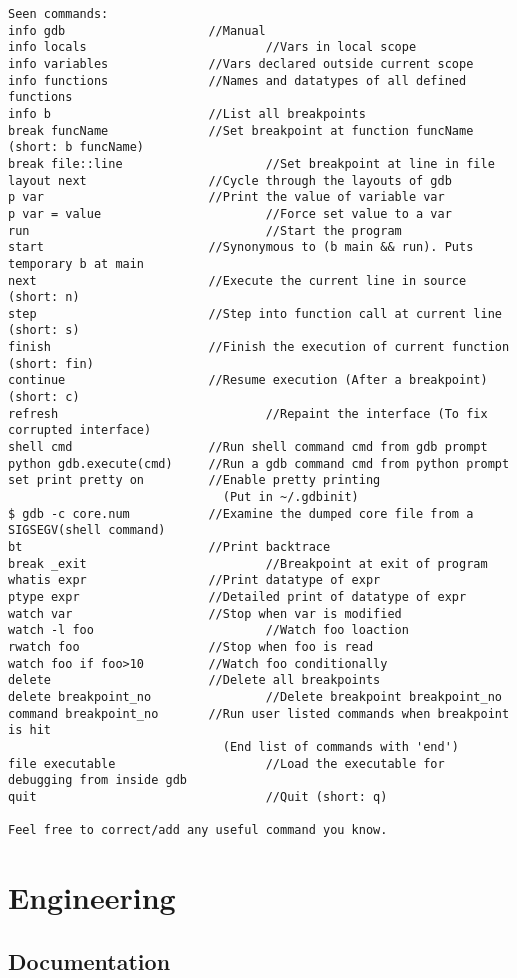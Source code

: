 \documentclass[openany]{report}
\begin{document}
\begin{verbatim}
Seen commands:
info gdb 					//Manual
info locals 				        //Vars in local scope
info variables				//Vars declared outside current scope
info functions				//Names and datatypes of all defined functions
info b 						//List all breakpoints
break funcName				//Set breakpoint at function funcName (short: b funcName)
break file::line			        //Set breakpoint at line in file
layout next					//Cycle through the layouts of gdb
p var 						//Print the value of variable var
p var = value 			        	//Force set value to a var
run 						        //Start the program
start 						//Synonymous to (b main && run). Puts temporary b at main
next 						//Execute the current line in source (short: n)
step 						//Step into function call at current line (short: s)
finish						//Finish the execution of current function (short: fin)
continue					//Resume execution (After a breakpoint) (short: c)
refresh 					        //Repaint the interface (To fix corrupted interface)
shell cmd 					//Run shell command cmd from gdb prompt
python gdb.execute(cmd)		//Run a gdb command cmd from python prompt
set print pretty on			//Enable pretty printing
							  (Put in ~/.gdbinit)
$ gdb -c core.num			//Examine the dumped core file from a SIGSEGV(shell command)
bt							//Print backtrace
break _exit 				        //Breakpoint at exit of program
whatis expr					//Print datatype of expr
ptype expr					//Detailed print of datatype of expr
watch var 					//Stop when var is modified
watch -l foo				        //Watch foo loaction
rwatch foo					//Stop when foo is read
watch foo if foo>10			//Watch foo conditionally
delete						//Delete all breakpoints
delete breakpoint_no		        //Delete breakpoint breakpoint_no
command breakpoint_no		//Run user listed commands when breakpoint is hit
							  (End list of commands with 'end')
file executable 			        //Load the executable for debugging from inside gdb
quit						        //Quit (short: q)

Feel free to correct/add any useful command you know.
\end{verbatim}

\chapter{Engineering}

\section{Documentation}
\end{document}
